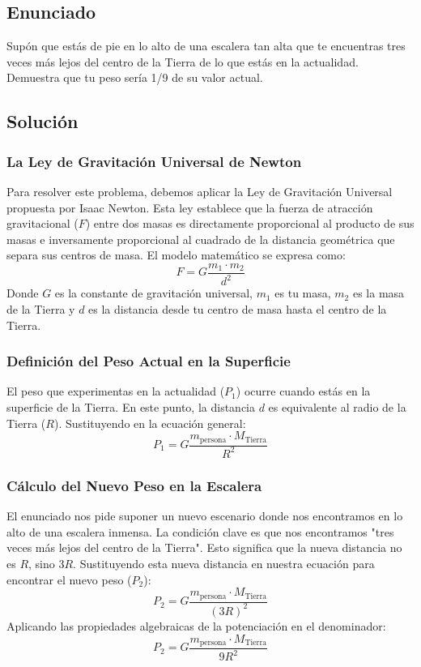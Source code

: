 \documentclass[12pt]{article}
\begin{document}
\newpage

\subsection*{Enunciado}
Supón que estás de pie en lo alto de una escalera tan alta que te encuentras tres veces más lejos del centro de la Tierra de lo que estás en la actualidad. Demuestra que tu peso sería 1/9 de su valor actual.

\subsection*{Solución}

\subsubsection*{La Ley de Gravitación Universal de Newton}
Para resolver este problema, debemos aplicar la Ley de Gravitación Universal propuesta por Isaac Newton. Esta ley establece que la fuerza de atracción gravitacional ($F$) entre dos masas es directamente proporcional al producto de sus masas e inversamente proporcional al cuadrado de la distancia geométrica que separa sus centros de masa.
El modelo matemático se expresa como:
\begin{equation}
    F = G \frac{m_1 \cdot m_2}{d^2}
\end{equation}
Donde $G$ es la constante de gravitación universal, $m_1$ es tu masa, $m_2$ es la masa de la Tierra y $d$ es la distancia desde tu centro de masa hasta el centro de la Tierra.

\subsubsection*{Definición del Peso Actual en la Superficie}
El peso que experimentas en la actualidad ($P_1$) ocurre cuando estás en la superficie de la Tierra. En este punto, la distancia $d$ es equivalente al radio de la Tierra ($R$). Sustituyendo en la ecuación general:
\begin{equation}
    P_1 = G \frac{m_{\text{persona}} \cdot M_{\text{Tierra}}}{R^2}
\end{equation}

\subsubsection*{Cálculo del Nuevo Peso en la Escalera}
El enunciado nos pide suponer un nuevo escenario donde nos encontramos en lo alto de una escalera inmensa. La condición clave es que nos encontramos "tres veces más lejos del centro de la Tierra". Esto significa que la nueva distancia no es $R$, sino $3R$.
Sustituyendo esta nueva distancia en nuestra ecuación para encontrar el nuevo peso ($P_2$):
\begin{equation}
    P_2 = G \frac{m_{\text{persona}} \cdot M_{\text{Tierra}}}{(3R)^2}
\end{equation}
Aplicando las propiedades algebraicas de la potenciación en el denominador:
\begin{equation}
    P_2 = G \frac{m_{\text{persona}} \cdot M_{\text{Tierra}}}{9 R^2}
\end{equation}
\end{document}

